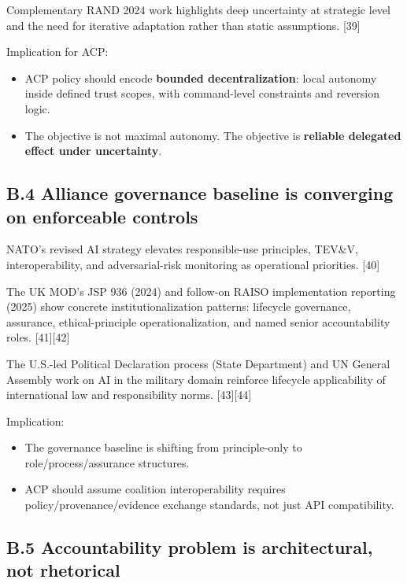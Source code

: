 \documentclass[
]{article}
\providecommand{\tightlist}{%
  \setlength{\itemsep}{0pt}\setlength{\parskip}{0pt}}
\begin{document}
Complementary RAND 2024 work highlights deep uncertainty at strategic
level and the need for iterative adaptation rather than static
assumptions. {[}39{]}

Implication for ACP:

\begin{itemize}
\tightlist
\item
  ACP policy should encode \textbf{bounded decentralization}: local
  autonomy inside defined trust scopes, with command-level constraints
  and reversion logic.
\item
  The objective is not maximal autonomy. The objective is
  \textbf{reliable delegated effect under uncertainty}.
\end{itemize}

\hypertarget{b.4-alliance-governance-baseline-is-converging-on-enforceable-controls}{%
\subsection{B.4 Alliance governance baseline is converging on
enforceable
controls}\label{b.4-alliance-governance-baseline-is-converging-on-enforceable-controls}}

NATO's revised AI strategy elevates responsible-use principles, TEV\&V,
interoperability, and adversarial-risk monitoring as operational
priorities. {[}40{]}

The UK MOD's JSP 936 (2024) and follow-on RAISO implementation reporting
(2025) show concrete institutionalization patterns: lifecycle
governance, assurance, ethical-principle operationalization, and named
senior accountability roles. {[}41{]}{[}42{]}

The U.S.-led Political Declaration process (State Department) and UN
General Assembly work on AI in the military domain reinforce lifecycle
applicability of international law and responsibility norms.
{[}43{]}{[}44{]}

Implication:

\begin{itemize}
\tightlist
\item
  The governance baseline is shifting from principle-only to
  role/process/assurance structures.
\item
  ACP should assume coalition interoperability requires
  policy/provenance/evidence exchange standards, not just API
  compatibility.
\end{itemize}

\hypertarget{b.5-accountability-problem-is-architectural-not-rhetorical}{%
\subsection{B.5 Accountability problem is architectural, not
rhetorical}\label{b.5-accountability-problem-is-architectural-not-rhetorical}}
\end{document}
